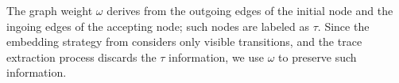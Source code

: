 \begin{table}[!t]
	\caption{Projections of $\tg$ over $\net$-traces of length $4$.}\label{tab:proj}
	\centering
\end{table}
The graph weight $\omega$ derives from the outgoing edges of the initial node and the ingoing edges of the accepting node; 
such nodes are labeled as $\tau$. Since the embedding strategy from \cite{LodhiSSCW02} considers only visible 
transitions, and the trace extraction process discards the $\tau$ information, we use $\omega$ to preserve such information.
